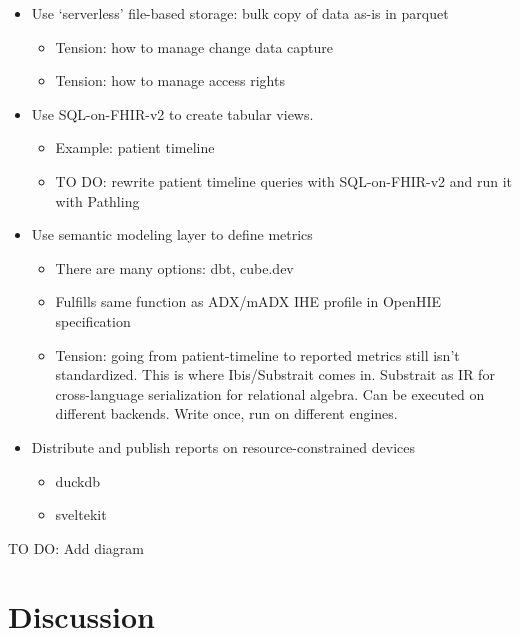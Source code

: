 \documentclass[
  authoryear]{elsarticle}
\providecommand{\tightlist}{%
  \setlength{\itemsep}{0pt}\setlength{\parskip}{0pt}}\usepackage{longtable,booktabs,array}
\begin{document}
\begin{itemize}
\tightlist
\item
  Use `serverless' file-based storage: bulk copy of data as-is in
  parquet

  \begin{itemize}
  \tightlist
  \item
    Tension: how to manage change data capture
  \item
    Tension: how to manage access rights
  \end{itemize}
\item
  Use SQL-on-FHIR-v2 to create tabular views.

  \begin{itemize}
  \tightlist
  \item
    Example: patient timeline
  \item
    TO DO: rewrite patient timeline queries with SQL-on-FHIR-v2 and run
    it with Pathling
  \end{itemize}
\item
  Use semantic modeling layer to define metrics

  \begin{itemize}
  \tightlist
  \item
    There are many options: dbt, cube.dev
  \item
    Fulfills same function as ADX/mADX IHE profile in OpenHIE
    specification
  \item
    Tension: going from patient-timeline to reported metrics still isn't
    standardized. This is where Ibis/Substrait comes in. Substrait as IR
    for cross-language serialization for relational algebra. Can be
    executed on different backends. Write once, run on different
    engines.
  \end{itemize}
\item
  Distribute and publish reports on resource-constrained devices

  \begin{itemize}
  \tightlist
  \item
    duckdb
  \item
    sveltekit
  \end{itemize}
\end{itemize}

TO DO: Add diagram

\section{Discussion}\label{discussion}
\end{document}
